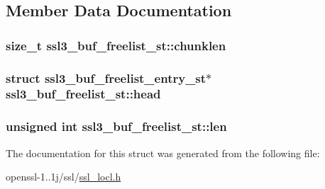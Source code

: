\subsection{Member Data Documentation}
\hypertarget{structssl3__buf__freelist__st_a7a2667b7570a0139e5fca958b230cfc5}{
\subsubsection[{chunklen}]{\setlength{\rightskip}{0pt plus 5cm}size\-\_\-t ssl3\-\_\-buf\-\_\-freelist\-\_\-st\-::chunklen}}\label{structssl3__buf__freelist__st_a7a2667b7570a0139e5fca958b230cfc5}
\hypertarget{structssl3__buf__freelist__st_abe3d954757ec9de9f78eefb7de4916ec}{
\subsubsection[{head}]{\setlength{\rightskip}{0pt plus 5cm}struct {\bf ssl3\-\_\-buf\-\_\-freelist\-\_\-entry\-\_\-st}$\ast$ ssl3\-\_\-buf\-\_\-freelist\-\_\-st\-::head}}\label{structssl3__buf__freelist__st_abe3d954757ec9de9f78eefb7de4916ec}
\hypertarget{structssl3__buf__freelist__st_a625bc725b998ae8b8228d99c6e7d523e}{
\subsubsection[{len}]{\setlength{\rightskip}{0pt plus 5cm}unsigned int ssl3\-\_\-buf\-\_\-freelist\-\_\-st\-::len}}\label{structssl3__buf__freelist__st_a625bc725b998ae8b8228d99c6e7d523e}


The documentation for this struct was generated from the following file\-:\begin{DoxyCompactItemize}
\item 
openssl-\/1..\-1j/ssl/\hyperlink{ssl__locl_8h}{ssl\-\_\-locl.\-h}\end{DoxyCompactItemize}
